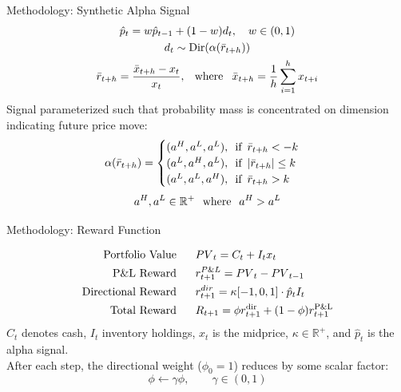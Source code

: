 \documentclass{beamer}
\begin{document}
\begin{frame}{Methodology: Synthetic Alpha Signal}
    \begin{gather*}
    \hat{p}_t = w\hat{p}_{t-1} + (1 - w)d_t, \hspace{1em}w\in (0,1) \\
    d_t \sim \text{Dir}(\alpha(\bar{r}_{t+h})) \\
    \bar{r}_{t+h} = \frac{\bar{x}_{t+h}-x_t}{x_t}, \hspace{0.8em} \text{where} \hspace{0.8em} \bar{x}_{t+h} = \frac{1}{h}\sum_{i=1}^h x_{t+i}
    \end{gather*}
    Signal parameterized such that probability mass is concentrated on dimension indicating future price move:
    $$
    \alpha(\bar{r}_{t+h}) = 
    \begin{cases}
    (a^H, a^L, a^L), \hspace{0.5em} \text{if}\hspace{0.5em} \bar{r}_{t+h} < -k\\
    (a^L, a^H, a^L), \hspace{0.5em} \text{if}\hspace{0.5em} |\bar{r}_{t+h}| \le k\\
    (a^L, a^L, a^H), \hspace{0.5em} \text{if}\hspace{0.5em} \bar{r}_{t+h} > k\\
    \end{cases}$$
    $$
    a^H, a^L \in \mathbb{R^+} \hspace{0.7em} \text{where} \hspace{0.7em} a^H > a^L
    $$
        
    \end{frame}
    
    \begin{frame}{Methodology: Reward Function}
    
    \begin{align*}
        \text{Portfolio Value}& \hspace{1.7em} {PV}_t = C_t + I_tx_t\\
        \text{P\&L Reward}&\hspace{1.7em} r^{P\&L}_{t+1} = {PV}_t - {PV}_{t-1}\\
        \text{Directional Reward}& \hspace{1.7em} r^{dir}_{t+1} = \kappa [-1,0,1]\cdot \hat{p}_t I_t\\
        \text{Total Reward}& \hspace{1.7em} R_{t+1} = \phi r^{\text{dir}}_{t+1} + (1 - \phi)r^{\text{P\&L}}_{t+1}\\
    \end{align*}
    $C_t$ denotes cash, $I_t$ inventory holdings, $x_t$ is the midprice, $\kappa \in \mathbb{R^+}$, and $\hat{p}_t$ is the alpha signal.\\
    \vspace{1em}
    After each step, the directional weight ($\phi_0 = 1$) reduces by some scalar factor:
    $$\phi \leftarrow \gamma\phi, \hspace{2em}\gamma\in(0,1)$$
    \end{frame}
\end{document}
